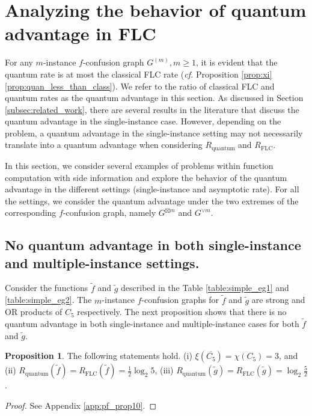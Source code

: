\documentclass[journal, onecolumn, draftcls]{IEEEtran}
\theoremstyle{definition}
\newtheorem{proposition}{Proposition}
\newcommand{\meng}[1]{\marginpar{+}{\bf Ruoyu's remark}: {\em #1}}
\newcommand{\aditya}[1]{\marginpar{+}{\bf Aditya's remark}: {\em #1}}
\begin{document}
\section{Analyzing the behavior of quantum advantage in FLC}\label{sec:analysis_bahavior_quantum_advantage}
For any $m$-instance $f$-confusion graph $G^{(m)}, m \geq 1$, it is evident that the quantum rate is at most the classical FLC rate ({\it cf.} Proposition \ref{prop:xi} \ref{prop:quan_less_than_class}). We refer to the ratio of classical FLC and quantum rates as the quantum advantage in this section. As discussed in Section \ref{subsec:related_work}, there are several results in the literature that discuss the quantum advantage in the single-instance case. However, depending on the problem, a quantum advantage in the single-instance setting may not necessarily translate into a quantum advantage when considering $R_{\text{quantum}}$ and $R_{\text{FLC}}$.

In this section, we consider several examples of problems within function computation with side information and explore the behavior of the quantum advantage in the different settings (single-instance and asymptotic rate). For all the settings, we consider the quantum advantage under the two extremes of the corresponding $f$-confusion graph, namely $G^{\boxtimes m}$ and $G^{\lor m}$.%

\subsection{No quantum advantage in both single-instance and multiple-instance settings.\label{subsec:C5}}

Consider the functions $\tilde f$ and $\tilde g$ described in the  Table \ref{table:simple_eg1} and \ref{table:simple_eg2}. The $m$-instance $f$-confusion graphs for $\tilde f$ and $\tilde g$ are strong and OR products of $C_5$ respectively.   The next proposition shows that there is no quantum advantage in both single-instance and multiple-instance cases for both $\tilde f$ and $\tilde g$. 
\begin{proposition}\label{prop:C5_AND_rates} The following statements hold. (i) $\xi(\overline{C_5}) = \chi(C_5)=3$, and (ii)
$R_{\text{quantum}}(\tilde f)  = R_{\text{FLC}}(\tilde f) = \frac{1}{2}\log_2 5$, (iii)
$R_{\text{quantum}}(\tilde g)  = R_{\text{FLC}}(\tilde g) =  \log_2 \frac{5}{2}$. 
\end{proposition}
\begin{proof}
    See Appendix \ref{app:pf_prop10}.
\end{proof}
\end{document}
